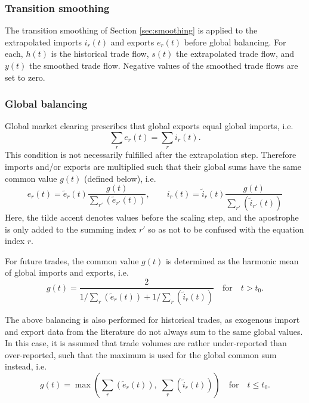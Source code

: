 \subsubsection{Transition smoothing} \label{sec:trade_smoothing}

The transition smoothing of Section \ref{sec:smoothing} is applied to the extrapolated imports $i_r(t)$ and exports $e_r(t)$ before global balancing. For each, $h(t)$ is the historical trade flow, $s(t)$ the extrapolated trade flow, and $y(t)$ the smoothed trade flow. Negative values of the smoothed trade flows are set to zero.

\subsubsection{Global balancing} \label{sec:trade_balancing}

Global market clearing prescribes that global exports equal global imports, i.e.
\begin{equation}
    \sum_r e_r(t) = \sum_r i_r(t).
\end{equation}
This condition is not necessarily fulfilled after the extrapolation step. Therefore imports and/or exports are multiplied such that their global sums have the same common value $g(t)$ (defined below), i.e.
 \begin{equation}
    e_r(t) = \tilde{e}_r(t) \frac{g(t)}{\sum_{r'} (\tilde{e}_{r'}(t))},
    \qquad
    i_r(t) = \tilde{i}_r(t) \frac{g(t)}{\sum_{r'} (\tilde{i}_{r'}(t))}
\end{equation}
Here, the tilde accent denotes values before the scaling step, and the apostrophe is only added to the summing index $r'$ so as not to be confused with the equation index $r$.

For future trades, the common value $g(t)$ is determined as the harmonic mean of global imports and exports, i.e.
\begin{equation}
    g(t) = \frac{2}{1/\sum_r (\tilde{e}_r(t)) + 1/\sum_r (\tilde{i}_r(t))}
    \quad\text{for}\quad t > t_{0}.
\end{equation}

The above balancing is also performed for historical trades, as exogenous import and export data from the literature do not always sum to the same global values. In this case, it is assumed that trade volumes are rather under-reported than over-reported, such that the maximum is used for the global common sum instead, i.e.
\begin{equation}
    g(t) = \max \left( \sum_r (\tilde{e}_r(t)),\; \sum_r (\tilde{i}_r(t))\right)
    \quad\text{for}\quad t \leq t_{0}.
\end{equation}

